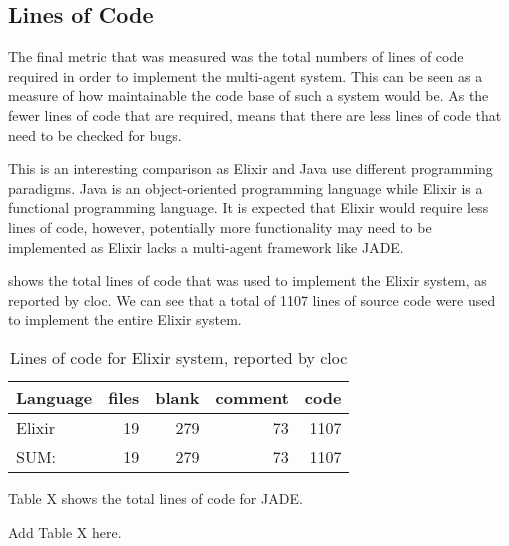 \subsection{Lines of Code}

The final metric that was measured was the total numbers of lines of code required in order to implement the multi-agent system.
This can be seen as a measure of how maintainable the code base of such a system would be.
As the fewer lines of code that are required, means that there are less lines of code that need to be checked for bugs.

This is an interesting comparison as Elixir and Java use different programming paradigms.
Java is an object-oriented programming language while Elixir is a functional programming language.
It is expected that Elixir would require less lines of code, however, potentially more functionality may need to be implemented as Elixir lacks a multi-agent framework like JADE\@.

 shows the total lines of code that was used to implement the Elixir system, as reported by cloc.
We can see that a total of 1107 lines of source code were used to implement the entire Elixir system.

\begin{table}[h]
    \centering
    \begin{tabular}{lrrrr}
        \toprule
        Language & files & blank & comment & code\\
        \midrule
        Elixir & 19 & 279 & 73 & 1107\\
        \midrule
        SUM\@: & 19 & 279 & 73 & 1107\\
        \bottomrule
    \end{tabular}
    \caption{Lines of code for Elixir system, reported by cloc}\label{tab:elixir_loc}
\end{table}

Table X shows the total lines of code for JADE\@.

Add Table X here.
